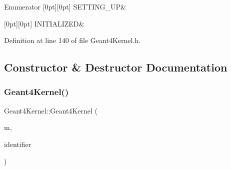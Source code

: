 \begin{DoxyEnumFields}{Enumerator}
[0pt][0pt]{}\hypertarget{class_d_d4hep_1_1_simulation_1_1_geant4_kernel_ab0de90f94bc8898e60c2ca6cef292d92ad9e96c644ab9e3980c3c72ffb02cdefc}{}\label{class_d_d4hep_1_1_simulation_1_1_geant4_kernel_ab0de90f94bc8898e60c2ca6cef292d92ad9e96c644ab9e3980c3c72ffb02cdefc} 
S\+E\+T\+T\+I\+N\+G\+\_\+\+UP&\\
\hline

[0pt][0pt]{}\hypertarget{class_d_d4hep_1_1_simulation_1_1_geant4_kernel_ab0de90f94bc8898e60c2ca6cef292d92a0d9e793dd29116f95a10525a25f9701a}{}\label{class_d_d4hep_1_1_simulation_1_1_geant4_kernel_ab0de90f94bc8898e60c2ca6cef292d92a0d9e793dd29116f95a10525a25f9701a} 
I\+N\+I\+T\+I\+A\+L\+I\+Z\+ED&\\
\hline

\end{DoxyEnumFields}


Definition at line 140 of file Geant4\+Kernel.\+h.



\subsection{Constructor \& Destructor Documentation}
\hypertarget{class_d_d4hep_1_1_simulation_1_1_geant4_kernel_ad73b43c4abdbae6586b77ffdb06492d1}{}\label{class_d_d4hep_1_1_simulation_1_1_geant4_kernel_ad73b43c4abdbae6586b77ffdb06492d1} 
\subsubsection{\texorpdfstring{Geant4\+Kernel()}{Geant4Kernel()}\hspace{0.1cm}{\footnotesize\ttfamily [1/2]}}
{\footnotesize\ttfamily Geant4\+Kernel\+::\+Geant4\+Kernel (\begin{DoxyParamCaption}\item[{\hyperlink{class_d_d4hep_1_1_simulation_1_1_geant4_kernel}{Geant4\+Kernel} $\ast$}]{m,  }\item[{unsigned long}]{identifier }\end{DoxyParamCaption})\hspace{0.3cm}{\ttfamily [protected]}}



